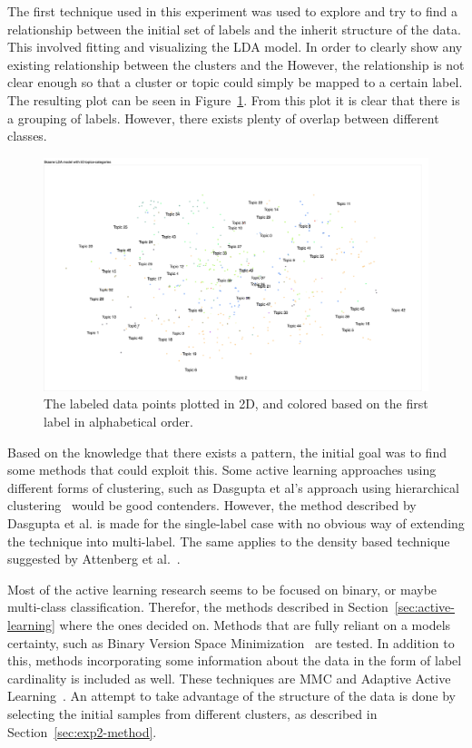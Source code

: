 The first technique used in this experiment was used to explore and try to find a relationship between the initial set of labels and the inherit structure of the data.
This involved fitting and visualizing the LDA model.
In order to clearly show any existing relationship between the clusters and the 
However, the relationship is not clear enough so that a cluster or topic could simply be mapped to a certain label.
The resulting plot can be seen in Figure~\ref{fig:categories-lda-50}.
From this plot it is clear that there is a grouping of labels.
However, there exists plenty of overlap between different classes.

\begin{figure}
    \centering
    \includegraphics[scale=0.35, angle=270]{figures/categories-lda-50.png}
    \caption{The labeled data points plotted in 2D, and colored based on the first label in alphabetical order.}
    \label{fig:categories-lda-50}
\end{figure}

Based on the knowledge that there exists a pattern, the initial goal was to find some methods that could exploit this.
Some active learning approaches using different forms of clustering, such as Dasgupta et al\@'s approach using hierarchical clustering~\cite{dasgupta2008hierarchical} would be good contenders.
However, the method described by Dasgupta et al\@. is made for the single-label case with no obvious way of extending the technique into multi-label.
The same applies to the density based technique suggested by Attenberg et al\@.~\cite{attenberg2013class}.

Most of the active learning research seems to be focused on binary, or maybe multi-class classification.
Therefor, the methods described in Section~\ref{sec:active-learning} where the ones decided on.
Methods that are fully reliant on a models certainty, such as Binary Version Space Minimization~\cite{brinker2006active} are tested.
In addition to this, methods incorporating some information about the data in the form of label cardinality is included as well.
These techniques are MMC and Adaptive Active Learning~\cite{yang2009effective, li2013active}.
An attempt to take advantage of the structure of the data is done by selecting the initial samples from different clusters, as described in Section~\ref{sec:exp2-method}.

